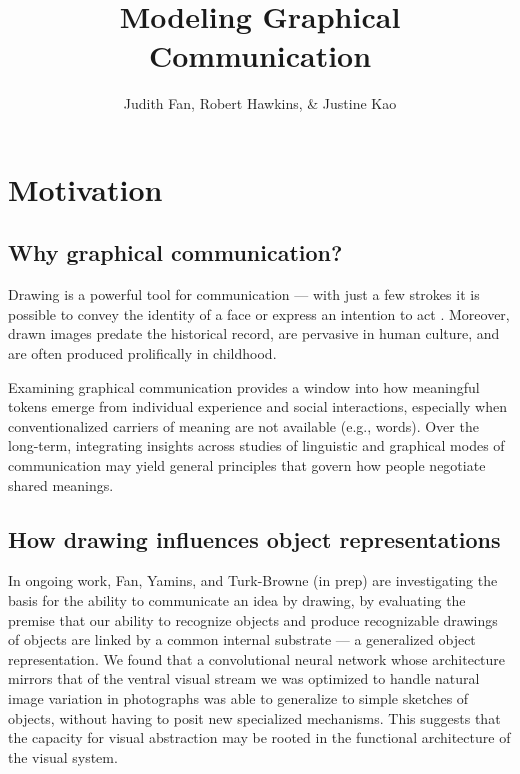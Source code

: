 \documentclass[12pt]{article}
\title{\textbf{Modeling Graphical Communication}}
\author{Judith Fan, Robert Hawkins, \& Justine Kao}
\begin{document}
\maketitle %

\section{Motivation}

\subsection{Why graphical communication?}

Drawing is a powerful tool for communication --- with just a few strokes it is possible to convey the identity of a face \cite{bergmann2013impact} or express an intention to act \cite{Galantucci:2005uh}. Moreover, drawn images predate the historical record, are pervasive in human culture, and are often produced prolifically in childhood.

Examining graphical communication provides a window into how meaningful tokens emerge from individual experience and social interactions, especially when conventionalized carriers of meaning are not available (e.g., words). Over the long-term, integrating insights across studies of linguistic and graphical modes of communication may yield general principles that govern how people negotiate shared meanings.  

\subsection{How drawing influences object representations}

In ongoing work, Fan, Yamins, and Turk-Browne (in prep) are investigating the basis for the ability to communicate an idea by drawing, by evaluating the premise that our ability to recognize objects and produce recognizable drawings of objects are linked by a common internal substrate --- a generalized object representation. We found that a convolutional neural network whose architecture mirrors that of the ventral visual stream we was optimized to handle natural image variation in photographs \cite{Yamins:2014gia} was able to generalize to simple sketches of objects, without having to posit new specialized mechanisms. This suggests that the capacity for visual abstraction may be rooted in the functional architecture of the visual system.
\end{document}
